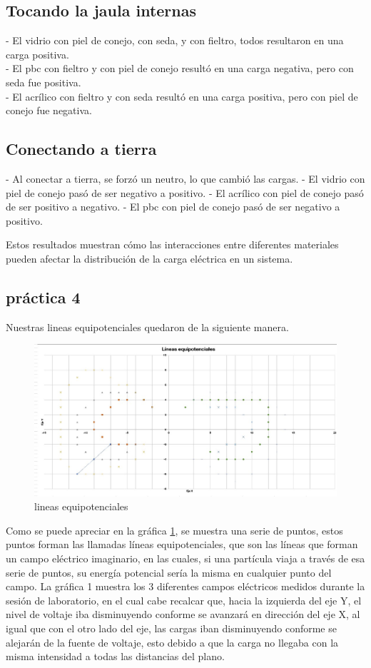 \documentclass{article}
\begin{document}
\subsection*{Tocando la jaula internas}
- El vidrio con piel de conejo, con seda, y con fieltro, todos resultaron en una carga positiva.\\
- El pbc con fieltro y con piel de conejo resultó en una carga negativa, pero con seda fue positiva.\\
- El acrílico con fieltro y con seda resultó en una carga positiva, pero con piel de conejo fue negativa.

\subsection*{Conectando a tierra}
- Al conectar a tierra, se forzó un neutro, lo que cambió las cargas. 
- El vidrio con piel de conejo pasó de ser negativo a positivo.
- El acrílico con piel de conejo pasó de ser positivo a negativo.
- El pbc con piel de conejo pasó de ser negativo a positivo.

Estos resultados muestran cómo las interacciones entre diferentes materiales pueden afectar la distribución de la carga eléctrica en un sistema.

\subsection{práctica 4}\label{p4}
Nuestras lineas equipotenciales quedaron de la siguiente manera.

\begin{figure}[H]
	\centering	
	\includegraphics[scale=0.6]{imgs/g.jpeg}
	\caption{lineas equipotenciales}
	\label{Fig:1}
\end{figure}

Como se puede apreciar en la gráfica \ref{Fig:1}, se muestra una serie de puntos, estos puntos forman las llamadas líneas equipotenciales, que son las líneas que forman un campo eléctrico imaginario, en las cuales, si una partícula viaja a través de esa serie de puntos, su energía potencial sería la misma en cualquier punto del campo. La gráfica 1 muestra los 3 diferentes campos eléctricos medidos durante la sesión de laboratorio, en el cual cabe recalcar que, hacia la izquierda del eje Y, el nivel de voltaje iba disminuyendo conforme se avanzará en dirección del eje X, al igual que con el otro lado del eje, las cargas iban disminuyendo conforme se alejarán de la fuente de voltaje, esto debido a que la carga no llegaba con la misma intensidad a todas las distancias del plano.
\end{document}
